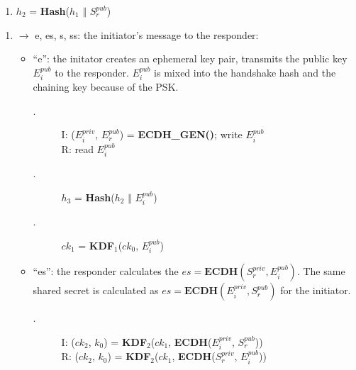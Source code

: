     \begin{center}
      \begin{varwidth}{\textwidth}
      \begin{enumerate} [start = \value{cnt}]
          \item $h_2$ = \textbf{Hash}($h_1$ $\Vert$ $S^{pub}_r$)
          \addtocounter{cnt}{1}
      \end{enumerate}
      \end{varwidth}
    \end{center}

  \begin{enumerate} [start = \value{msg}]
    \item $\rightarrow$ e, es, s, ss: the initiator's message to the responder:
    \addtocounter{msg}{1}
    \begin{itemize}
      \item ``e'': the initator creates an ephemeral key pair, transmits the public key
      $E^{pub}_i$ to the responder. $E^{pub}_i$ is mixed into the handshake hash and the chaining
      key because of the PSK.
      \begin{center}
        \begin{varwidth}{\textwidth}
          \begin{description}
          \item[\textnormal{}.] I: ($E^{priv}_i$, $E^{pub}_r$) = \textbf{ECDH{\_}GEN()}; write $E^{pub}_i$ \\
                R:  read $E^{pub}_i$
          \addtocounter{cnt}{1}
          \item[\textnormal{}.] $h_3$ = \textbf{Hash}($h_2$ $\Vert$ $E^{pub}_i$)
          \addtocounter{cnt}{1}
          \item[\textnormal{}.] $ck_1$ = \textbf{KDF}$_1$($ck_0$, $E^{pub}_i$)
          \addtocounter{cnt}{1}
          \end{description}
        \end{varwidth}
      \end{center}
    \item ``es'':  the responder calculates the $es = \textbf{ECDH}(S^{priv}_r, E^{pub}_i)$. The
    same shared secret is calculated as $es = \textbf{ECDH}(E^{priv}_i, S^{pub}_r)$ for the initiator.
      \begin{center}
        \begin{varwidth}{\textwidth}
          \begin{description}
          \item[\textnormal{}.] 
                I: ($ck_2$, $k_0$) = \textbf{KDF}$_2$($ck_1$, \textbf{ECDH}($E^{priv}_i$, $S^{pub}_r$)) \\
                R: ($ck_2$, $k_0$) = \textbf{KDF}$_2$($ck_1$, \textbf{ECDH}($S^{priv}_r$, $E^{pub}_i$))
          \addtocounter{cnt}{1}
          \end{description}
        \end{varwidth}
      \end{center}


\end{itemize}
\end{enumerate}
